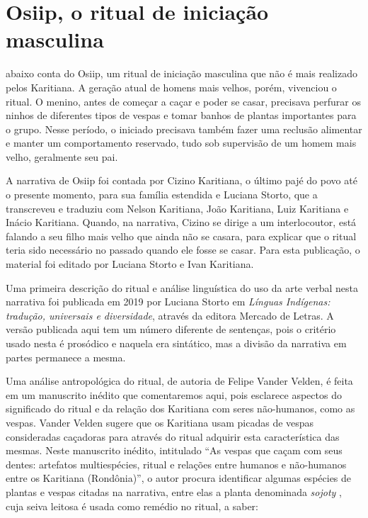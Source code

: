 \chapter{Osiip, o ritual de iniciação masculina}

 abaixo conta do Osiip, um ritual de iniciação masculina que
não é mais realizado pelos Karitiana. A geração atual de homens mais
velhos, porém, vivenciou o ritual. O menino, antes de começar a caçar e
poder se casar, precisava perfurar os ninhos de diferentes tipos de
vespas e tomar banhos de plantas importantes para o grupo. Nesse
período, o iniciado precisava também fazer uma reclusão alimentar e
manter um comportamento reservado, tudo sob supervisão de um homem mais
velho, geralmente seu pai.

A narrativa de Osiip foi contada por Cizino Karitiana, o último pajé do
povo até o presente momento, para sua família estendida e Luciana
Storto, que a transcreveu e traduziu com Nelson Karitiana, João
Karitiana, Luiz Karitiana e Inácio Karitiana. Quando, na narrativa,
Cizino se dirige a um interlocoutor, está falando a seu filho mais velho
que ainda não se casara, para explicar que o ritual teria sido
necessário no passado quando ele fosse se casar. Para esta publicação, o
material foi editado por Luciana Storto e Ivan Karitiana.

Uma primeira descrição do ritual e análise linguística do uso da arte
verbal nesta narrativa foi publicada em 2019 por Luciana Storto em
\emph{Línguas Indígenas: tradução, universais e diversidade}, através da
editora Mercado de Letras. A versão publicada aqui tem um número
diferente de sentenças, pois o critério usado nesta é prosódico e
naquela era sintático, mas a divisão da narrativa em partes permanece a
mesma.

Uma análise antropológica do ritual, de autoria de Felipe Vander Velden,
é feita em um manuscrito inédito que comentaremos aqui, pois esclarece
aspectos do significado do ritual e da relação dos Karitiana com seres
não-humanos, como as vespas. Vander Velden sugere que os Karitiana usam
picadas de vespas consideradas caçadoras para através do ritual adquirir
esta característica das mesmas. Neste manuscrito inédito, intitulado
``As vespas que caçam com seus dentes: artefatos multiespécies, ritual e
relações entre humanos e não-humanos entre os Karitiana (Rondônia)'', o
autor procura identificar algumas espécies de plantas e vespas citadas
na narrativa, entre elas a planta denominada \emph{sojoty} , cuja seiva
leitosa é usada como remédio no ritual, a saber:

